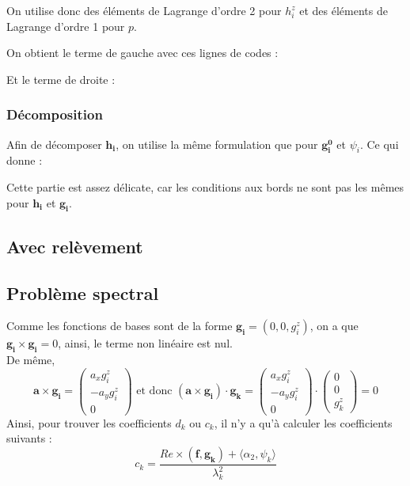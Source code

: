On utilise donc des éléments de Lagrange d'ordre 2 pour $h_i^z$ et des éléments de Lagrange d'ordre 1 pour $p$.


On obtient le terme de gauche avec ces lignes de codes :


Et le terme de droite :


\subsubsection{Décomposition}

Afin de décomposer $\bm{h_i}$, on utilise la même formulation que pour $\bm{g_i^0}$ et $\psi_i$. Ce qui donne :


Cette partie est assez délicate, car les conditions aux bords ne sont pas les mêmes pour $\bm{h_i}$ et $\bm{g_i}$.

\subsection{Avec relèvement}

\subsection{Problème spectral}

Comme les fonctions de bases sont de la forme $\bm{g_i}=(0,0,g_i^z)$, on a que $\bm{g_i}\times\bm{g_i}=0$, ainsi, le terme non linéaire est nul.\\

De même, 
\[
\bm{a}\times\bm{g_i}=\begin{pmatrix}
a_xg_i^z\\
-a_yg_i^z\\
0
\end{pmatrix}
\text{ et donc }
(\bm{a}\times\bm{g_i})\cdot\bm{g_k} = \begin{pmatrix}
a_xg_i^z\\
-a_yg_i^z\\
0
\end{pmatrix}\cdot\begin{pmatrix}
0\\
0\\
g_k^z
\end{pmatrix} = 0
\]
Ainsi, pour trouver les coefficients $d_k$ ou $c_k$, il n'y a qu'à calculer les coefficients suivants :
\[
c_k = \frac{Re\times (\bm{f},\bm{g_k})+\langle \alpha_2,\psi_k\rangle}{\lambda_k^2}
\]

